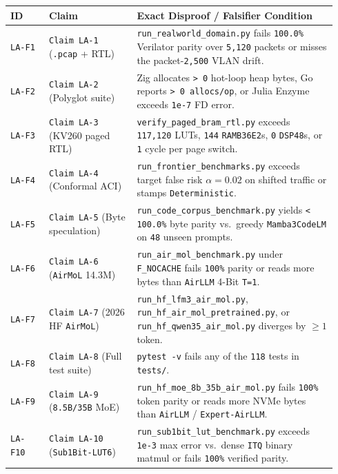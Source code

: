 \documentclass[10pt]{article}
\begin{document}
{\footnotesize
\begin{longtable}{@{}L{0.11\linewidth}L{0.25\linewidth}L{0.58\linewidth}@{}}
\toprule
\textbf{ID} & \textbf{Claim} & \textbf{Exact Disproof / Falsifier Condition} \\
\midrule
\endhead
\texttt{LA-F1} & \texttt{Claim LA-1} (\texttt{.pcap} + RTL) & \texttt{run\_realworld\_domain.py} fails \texttt{100.0\%} Verilator parity over \texttt{5,120} packets or misses the packet-\texttt{2,500} VLAN drift. \\
\texttt{LA-F2} & \texttt{Claim LA-2} (Polyglot suite) & Zig allocates \texttt{> 0} hot-loop heap bytes, Go reports \texttt{> 0 allocs/op}, or Julia Enzyme exceeds \texttt{1e-7} FD error. \\
\texttt{LA-F3} & \texttt{Claim LA-3} (KV260 paged RTL) & \texttt{verify\_paged\_bram\_rtl.py} exceeds \texttt{117,120} LUTs, \texttt{144} \texttt{RAMB36E2}s, \texttt{0} \texttt{DSP48}s, or \texttt{1} cycle per page switch. \\
\texttt{LA-F4} & \texttt{Claim LA-4} (Conformal ACI) & \texttt{run\_frontier\_benchmarks.py} exceeds target false risk $\alpha=0.02$ on shifted traffic or stamps \texttt{Deterministic}. \\
\texttt{LA-F5} & \texttt{Claim LA-5} (Byte speculation) & \texttt{run\_code\_corpus\_benchmark.py} yields \texttt{< 100.0\%} byte parity vs.\ greedy \texttt{Mamba3CodeLM} on \texttt{48} unseen prompts. \\
\texttt{LA-F6} & \texttt{Claim LA-6} (\texttt{AirMoL} 14.3M) & \texttt{run\_air\_mol\_benchmark.py} under \texttt{F\_NOCACHE} fails \texttt{100\%} parity or reads more bytes than \texttt{AirLLM} 4-Bit \texttt{T=1}. \\
\texttt{LA-F7} & \texttt{Claim LA-7} (2026 HF \texttt{AirMoL}) & \texttt{run\_hf\_lfm3\_air\_mol.py}, \texttt{run\_hf\_air\_mol\_pretrained.py}, or \texttt{run\_hf\_qwen35\_air\_mol.py} diverges by $\ge 1$ token. \\
\texttt{LA-F8} & \texttt{Claim LA-8} (Full test suite) & \texttt{pytest -v} fails any of the \texttt{118} tests in \texttt{tests/}. \\
\texttt{LA-F9} & \texttt{Claim LA-9} (\texttt{8.5B/35B} MoE) & \texttt{run\_hf\_moe\_8b\_35b\_air\_mol.py} fails \texttt{100\%} token parity or reads more NVMe bytes than \texttt{AirLLM} / \texttt{Expert-AirLLM}. \\
\texttt{LA-F10} & \texttt{Claim LA-10} (\texttt{Sub1Bit-LUT6}) & \texttt{run\_sub1bit\_lut\_benchmark.py} exceeds \texttt{1e-3} max error vs.\ dense \texttt{ITQ} binary matmul or fails \texttt{100\%} verified parity. \\

\end{longtable}}
\end{document}
